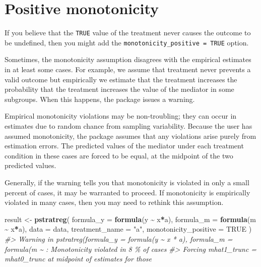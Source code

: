 \documentclass[
]{book}
\newenvironment{Shaded}{\begin{snugshade}}{\end{snugshade}}
\newcommand{\AttributeTok}[1]{\textcolor[rgb]{0.13,0.29,0.53}{#1}}
\newcommand{\CommentTok}[1]{\textcolor[rgb]{0.56,0.35,0.01}{\textit{#1}}}
\newcommand{\ConstantTok}[1]{\textcolor[rgb]{0.56,0.35,0.01}{#1}}
\newcommand{\FunctionTok}[1]{\textcolor[rgb]{0.13,0.29,0.53}{\textbf{#1}}}
\newcommand{\NormalTok}[1]{#1}
\newcommand{\OtherTok}[1]{\textcolor[rgb]{0.56,0.35,0.01}{#1}}
\newcommand{\SpecialCharTok}[1]{\textcolor[rgb]{0.81,0.36,0.00}{\textbf{#1}}}
\newcommand{\StringTok}[1]{\textcolor[rgb]{0.31,0.60,0.02}{#1}}
\begin{document}
\hypertarget{positive-monotonicity}{%
\section{Positive monotonicity}\label{positive-monotonicity}}

If you believe that the \texttt{TRUE} value of the treatment never causes the outcome to be undefined, then you might add the \texttt{monotonicity\_positive\ =\ TRUE} option.

Sometimes, the monotonicity assumption disagrees with the empirical estimates in at least some cases. For example, we assume that treatment never prevents a valid outcome but empirically we estimate that the treatment increases the probability that the treatment increases the value of the mediator in some subgroups. When this happens, the package issues a warning.

Empirical monotonicity violations may be non-troubling; they can occur in estimates due to random chance from sampling variability. Because the user has assumed monotonicity, the package assumes that any violations arise purely from estimation errors. The predicted values of the mediator under each treatment condition in these cases are forced to be equal, at the midpoint of the two predicted values.

Generally, if the warning tells you that monotonicity is violated in only a small percent of cases, it may be warranted to proceed. If monotonicity is empirically violated in many cases, then you may need to rethink this assumption.

\begin{Shaded}
\begin{Highlighting}[]
\NormalTok{result }\OtherTok{\textless{}{-}} \FunctionTok{pstratreg}\NormalTok{(}
  \AttributeTok{formula\_y =} \FunctionTok{formula}\NormalTok{(y }\SpecialCharTok{\textasciitilde{}}\NormalTok{ x}\SpecialCharTok{*}\NormalTok{a),}
  \AttributeTok{formula\_m =} \FunctionTok{formula}\NormalTok{(m }\SpecialCharTok{\textasciitilde{}}\NormalTok{ x}\SpecialCharTok{*}\NormalTok{a),}
  \AttributeTok{data =}\NormalTok{ data,}
  \AttributeTok{treatment\_name =} \StringTok{"a"}\NormalTok{,}
  \AttributeTok{monotonicity\_positive =} \ConstantTok{TRUE}
\NormalTok{)}
\CommentTok{\#\textgreater{} Warning in pstratreg(formula\_y = formula(y \textasciitilde{} x * a), formula\_m = formula(m \textasciitilde{} : Monotonicity violated in 8 \% of cases}
\CommentTok{\#\textgreater{} Forcing mhat1\_trunc = mhat0\_trunc at midpoint of estimates for those}
\end{Highlighting}
\end{Shaded}
\end{document}
